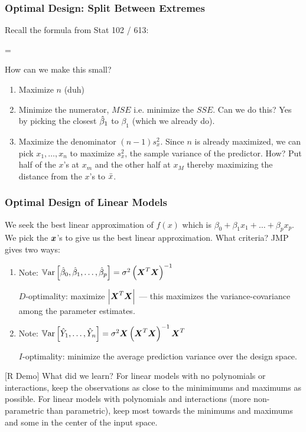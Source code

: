 \documentclass[handout]{beamer}
\begin{document}
\begin{frame}\frametitle{Optimal Design: Split Between Extremes}

Recall the formula from Stat 102 / 613:

\beqn
{} = 
\eeqn

How can we make this small?

\begin{enumerate}
\item Maximize $n$ (duh)
\item Minimize the numerator, $MSE$ i.e. minimize the $SSE$. Can we do this? Yes by picking the closest $\hat{\beta}_1$ to $\beta_1$ (which we already do). \pause
\item Maximize the denominator $(n-1) s^2_x$. Since $n$ is already maximized, we can pick $x_1, \ldots, x_n$ to maximize $s^2_x$, the sample variance of the predictor.  How? \pause Put half of the $x$'s at $x_m$ and the other half at $x_M$ thereby \pause maximizing the distance from the $x$'s to \pause $\bar{x}$.
\end{enumerate}
	
\end{frame}

\begin{frame}\frametitle{Optimal Design of Linear Models}
\small

We seek the best linear approximation of $f(x)$ which is $\beta_0 + \beta_1 x _1+ \ldots + \beta_p x_p$. We pick the $\boldsymbol{x}$'s to give us the best linear approximation. What criteria? JMP gives two ways:

\begin{enumerate}
\item Note: $\mathbb{V}\text{ar}\left[\hat{\beta}_0, \hat{\beta}_1, \ldots, \hat{\beta}_p\right] = \sigma^2 \left(\boldsymbol{X}^T\boldsymbol{X}\right)^{-1}$ \pause

$D$-optimality: maximize $\left|\boldsymbol{X}^T\boldsymbol{X}\right|$ --- this maximizes the variance-covariance among the parameter estimates. \pause

\item Note: $\mathbb{V}\text{ar}\left[\hat{Y}_1, \ldots, \hat{Y}_n\right] = \sigma^2 \boldsymbol{X}\left(\boldsymbol{X}^T\boldsymbol{X}\right)^{-1}\boldsymbol{X}^T$ \pause

$I$-optimality: minimize the average prediction variance over the design space.
\end{enumerate}

[R Demo] \pause What did we learn? \pause For linear models with no polynomials or interactions, keep the observations as close to the minimimums and maximums as possible. For linear models with polynomials and interactions (more non-parametric than parametric), \pause keep most towards the minimums and maximums and some in the center of the input space.

\end{frame}
\end{document}
